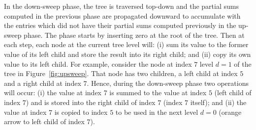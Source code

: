 \documentclass[Ingles]{ic-tese-v1}
\newcommand{\rfig}[1]{Figure~\ref{fig:#1}}
\begin{document}
In  the down-sweep  phase,  the  tree is  traversed  top-down and  the
partial sums computed in the previous phase are propagated downward to
accumulate  with the  entries which  did not  have their  partial sums
computed  previously  in the  up-sweep  phase.   The phase  starts  by
inserting zero at the  root of the tree. Then at  each step, each node
at the current tree level will: (i)  sum its value to the former value
of its left child and store the  result into its right child; and (ii)
copy its own value to its  left child.  For example, consider the node
at index $7$  level $d = 1$  of the tree in  \rfig{upsweep}. That node
has two children, a left child at index $5$ and a right child at index
$7$.  Hence,  during the down-sweep  phase two operations  will occur:
(i) the value at  index $7$ is summed to the value  at index $5$ (left
child of index  $7$) and is stored  into the right child  of index $7$
(index $7$ itself); and (ii) the value at index $7$ is copied to index
$5$ to be used  in the next level $d = 0$ (orange  arrow to left child
of index $7$).
\end{document}
